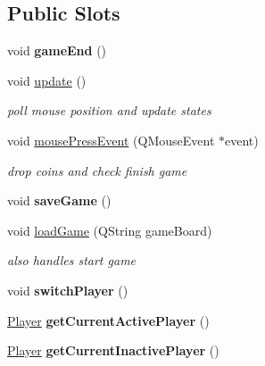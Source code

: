 \subsection*{Public Slots}
\begin{DoxyCompactItemize}
\item 
\hypertarget{class_game_manager_a55876082b15630acf8109b5f0a33e6bd}{void {\bfseries game\-End} ()}\label{class_game_manager_a55876082b15630acf8109b5f0a33e6bd}

\item 
\hypertarget{class_game_manager_a7ecc3a14cd9e92f50729b37d1364953f}{void \hyperlink{class_game_manager_a7ecc3a14cd9e92f50729b37d1364953f}{update} ()}\label{class_game_manager_a7ecc3a14cd9e92f50729b37d1364953f}

\begin{DoxyCompactList}\small\item\em poll mouse position and update states \end{DoxyCompactList}\item 
\hypertarget{class_game_manager_ac15bf5701604781f66047dc8c94f70a7}{void \hyperlink{class_game_manager_ac15bf5701604781f66047dc8c94f70a7}{mouse\-Press\-Event} (Q\-Mouse\-Event $\ast$event)}\label{class_game_manager_ac15bf5701604781f66047dc8c94f70a7}

\begin{DoxyCompactList}\small\item\em drop coins and check finish game \end{DoxyCompactList}\item 
\hypertarget{class_game_manager_a452f27d846213676394663c8d223983d}{void {\bfseries save\-Game} ()}\label{class_game_manager_a452f27d846213676394663c8d223983d}

\item 
\hypertarget{class_game_manager_ad7e262dd756247130c085ead21b34d87}{void \hyperlink{class_game_manager_ad7e262dd756247130c085ead21b34d87}{load\-Game} (Q\-String game\-Board)}\label{class_game_manager_ad7e262dd756247130c085ead21b34d87}

\begin{DoxyCompactList}\small\item\em also handles start game \end{DoxyCompactList}\item 
\hypertarget{class_game_manager_af49538ffbacf3ed465fe23191f0a7378}{void {\bfseries switch\-Player} ()}\label{class_game_manager_af49538ffbacf3ed465fe23191f0a7378}

\item 
\hypertarget{class_game_manager_aef672bf56ae84eb10a65bf227e487717}{\hyperlink{class_player}{Player} {\bfseries get\-Current\-Active\-Player} ()}\label{class_game_manager_aef672bf56ae84eb10a65bf227e487717}

\item 
\hypertarget{class_game_manager_a875582122292a52ffcae786a46490f89}{\hyperlink{class_player}{Player} {\bfseries get\-Current\-Inactive\-Player} ()}\label{class_game_manager_a875582122292a52ffcae786a46490f89}

\end{DoxyCompactItemize}
